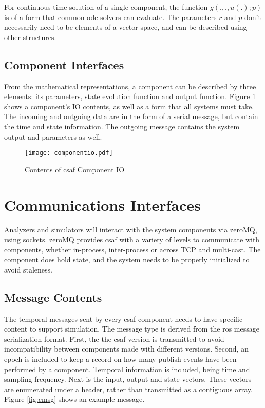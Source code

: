 For continuous time solution of a single component, the function $g(.,.,u(.);p)$ is of a form that common 
\acrshort{ode} solvers can evaluate. The parameters $r$ and $p$ don't necessarily need to be elements of a 
vector space, and can be described using other structures.

\subsection{Component Interfaces}

From the mathematical representations, a component can be described by three elements: its parameters, 
state evolution function and output function. Figure \ref{fig:cio} shows a component's IO contents, as well as 
a form that all systems must take. The incoming and outgoing data are in the form of a serial message, but 
contain the time and state information. The outgoing message contains the system output and parameters as 
well.

\begin{figure}
\centering
\texttt{[image: componentio.pdf]}
\caption{Contents of \acrshort{csaf}  Component IO}
\label{fig:cio}
\end{figure}

\section{Communications Interfaces}

Analyzers and simulators will interact with the system components via zeroMQ, using sockets. zeroMQ 
provides \acrshort{csaf}  with a variety of levels to communicate with components, whether in-process, 
inter-process or across TCP and multi-cast. The component does hold state, and the system needs to be 
properly initialized to avoid staleness.

\subsection{Message Contents}

The temporal messages sent by every \acrshort{csaf}  component needs to have specific content to support 
simulation. The message type is derived from the \acrshort{ros} message serialization format. First, the the 
\acrshort{csaf}  version is transmitted to avoid incompatibility between components made with different 
versions. Second, an epoch is included to keep a record on how many publish events have been performed 
by a component. Temporal information is included, being time and sampling frequency. Next is the input, 
output and state vectors. These vectors are enumerated under a header, rather than transmitted as a 
contiguous array. Figure \ref{fig:cmsg} shows an example message. \\

